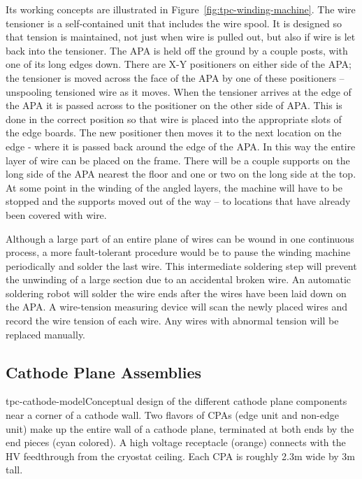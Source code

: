 Its working concepts are illustrated in Figure~\ref{fig:tpc-winding-machine}. 
The wire tensioner is a self-contained unit that includes the wire spool.  It is designed so that tension is maintained, not just when wire is pulled out, but also if wire is let back into the tensioner.  The APA is held off the ground by a couple posts, with one of its long edges down.  There are X-Y positioners on either side of the APA; the tensioner is moved across the face of the APA by one of these positioners -- unspooling tensioned wire as it moves.  When the tensioner arrives at the edge of the APA it is passed across to the positioner on the other side of APA.  This is done in the correct position so that wire is placed into the appropriate slots of the edge boards. The new positioner then moves it to the next location on the edge - where it is passed back around the edge of the APA.  In this way the entire layer of wire can be placed on the frame.  There will be a couple supports on the long side of the APA nearest the floor and one or two on the long side at the top.  At some point in the winding of the angled layers, the machine will have to be stopped and the supports moved out of the way -- to locations that have already been covered with wire.

Although a large part of an entire plane of wires can be wound in one continuous process, a more fault-tolerant procedure would be to pause the winding machine periodically and solder the last wire. This intermediate soldering step will prevent the unwinding of a large section due to an accidental broken wire.  An automatic soldering robot will solder the wire ends after the wires have been laid down on the APA. A wire-tension measuring device will scan the newly placed wires and record the wire tension of each wire. Any wires with abnormal tension will be replaced manually.



\subsection{Cathode Plane Assemblies}
\label{subsec:fd-ref-cpa}


\begin{cdrfigure}{tpc-cathode-model}{Conceptual design of the different cathode plane components near a corner of a cathode wall.  Two flavors of CPAs (edge unit and non-edge unit) make up the entire wall of a cathode plane, terminated at both ends by the end pieces (cyan colored).  A high voltage receptacle (orange) connects with the HV feedthrough from the cryostat ceiling. Each CPA is roughly 2.3m wide by 3m tall.}
\end{cdrfigure}



